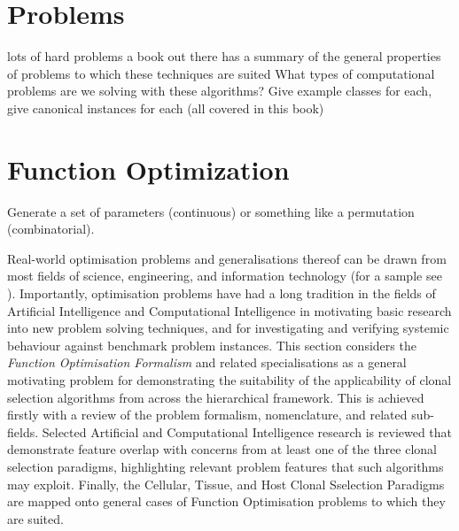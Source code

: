 \documentclass[a4paper, 11pt]{article}
\begin{document}
\section{Problems}
\label{sec:problems}
lots of hard problems
a book out there has a summary of the general properties of problems to which these techniques are suited
What types of computational problems are we solving with these algorithms?
Give example classes for each, give canonical instances for each (all covered in this book)



% 
%
\section{Function Optimization}
Generate a set of parameters (continuous) or something like a permutation (combinatorial).


Real-world optimisation problems and generalisations thereof can be drawn from most fields of science, engineering, and information technology (for a sample see \cite{Ali1997, Toern1999}). Importantly, optimisation problems have had a long tradition in the fields of Artificial Intelligence and Computational Intelligence in motivating basic research into new problem solving techniques, and for investigating and verifying systemic behaviour against benchmark problem instances.
This section considers the \emph{Function Optimisation Formalism} and related specialisations as a general motivating problem for demonstrating the suitability of the applicability of clonal selection algorithms from across the hierarchical framework.
This is achieved firstly with a review of the problem formalism, nomenclature, and related sub-fields. Selected Artificial and Computational Intelligence research is reviewed that demonstrate feature overlap with concerns from at least one of the three clonal selection paradigms, highlighting relevant problem features that such algorithms may exploit. Finally, the Cellular, Tissue, and Host Clonal Sselection Paradigms are mapped onto general cases of Function Optimisation problems to which they are suited.

%
%
\end{document}
